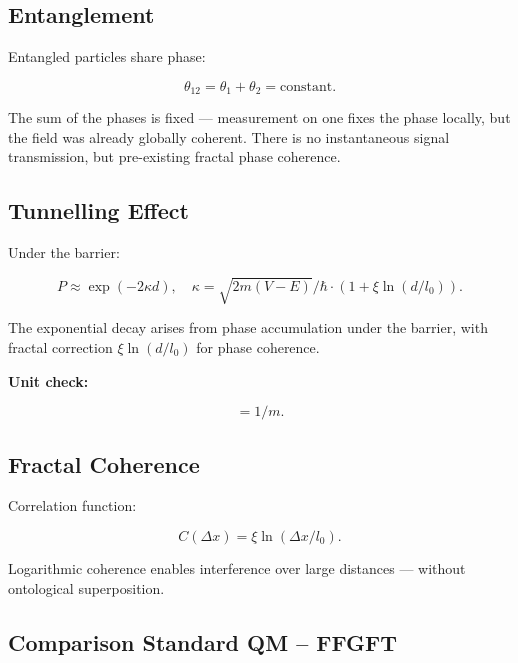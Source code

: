 	\subsection*{Entanglement}
	
	Entangled particles share phase:
	
	\begin{equation}
		\theta_{12} = \theta_1 + \theta_2 = \text{constant}.
	\end{equation}
	
	The sum of the phases is fixed — measurement on one fixes the phase locally, but the field was already globally coherent. There is no instantaneous signal transmission, but pre-existing fractal phase coherence.
	
	\subsection*{Tunnelling Effect}
	
	Under the barrier:
	
	\begin{equation}
		P \approx \exp\left( -2 \kappa d \right), \quad \kappa = \sqrt{2m(V-E)} / \hbar \cdot (1 + \xi \ln(d/l_0)).
	\end{equation}
	
	The exponential decay arises from phase accumulation under the barrier, with fractal correction \(\xi \ln(d/l_0)\) for phase coherence.
	
	\textbf{Unit check:}
	
	\begin{equation}
		[\kappa] = \si{1/m}.
	\end{equation}
	
	\subsection*{Fractal Coherence}
	
	Correlation function:
	
	\begin{equation}
		C(\Delta x) = \xi \ln(\Delta x / l_0).
	\end{equation}
	
	Logarithmic coherence enables interference over large distances — without ontological superposition.
	
	\subsection*{Comparison Standard QM – FFGFT}
	
